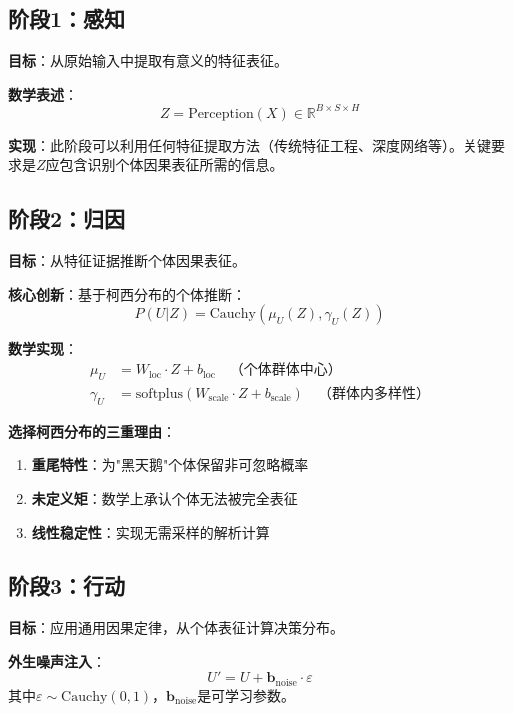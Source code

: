 \documentclass[conference]{IEEEtran}
\newcommand{\reals}{\mathbb{R}}
\newcommand{\cauchy}{\text{Cauchy}}
\begin{document}
\begin{CJK}{UTF8}{gbsn}
\subsection{阶段1：感知}

\textbf{目标}：从原始输入中提取有意义的特征表征。

\textbf{数学表述}：
\begin{equation}
Z = \text{Perception}(X) \in \reals^{B \times S \times H}
\end{equation}

\textbf{实现}：此阶段可以利用任何特征提取方法（传统特征工程、深度网络等）。关键要求是$Z$应包含识别个体因果表征所需的信息。

\subsection{阶段2：归因}

\textbf{目标}：从特征证据推断个体因果表征。

\textbf{核心创新}：基于柯西分布的个体推断：
\begin{equation}
P(U|Z) = \cauchy(\mu_U(Z), \gamma_U(Z))
\end{equation}

\textbf{数学实现}：
\begin{align}
\mu_U &= W_{\text{loc}} \cdot Z + b_{\text{loc}} \quad \text{（个体群体中心）} \\
\gamma_U &= \text{softplus}(W_{\text{scale}} \cdot Z + b_{\text{scale}}) \quad \text{（群体内多样性）}
\end{align}

\textbf{选择柯西分布的三重理由}：
\begin{enumerate}
\item \textbf{重尾特性}：为"黑天鹅"个体保留非可忽略概率
\item \textbf{未定义矩}：数学上承认个体无法被完全表征  
\item \textbf{线性稳定性}：实现无需采样的解析计算
\end{enumerate}

\subsection{阶段3：行动}

\textbf{目标}：应用通用因果定律，从个体表征计算决策分布。

\textbf{外生噪声注入}：
\begin{equation}
U' = U + \mathbf{b}_{\text{noise}} \cdot \varepsilon
\end{equation}
其中$\varepsilon \sim \cauchy(0, 1)$，$\mathbf{b}_{\text{noise}}$是可学习参数。


\end{CJK}
\end{document}
